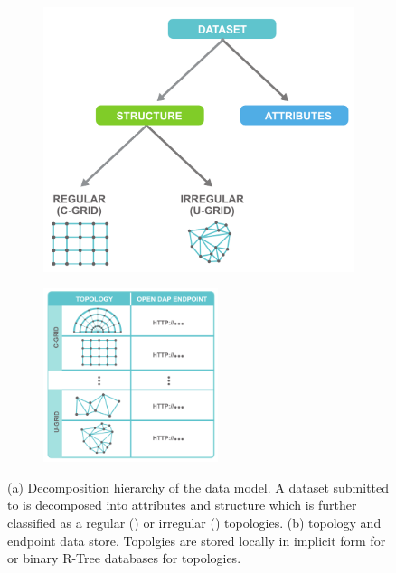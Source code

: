 \begin{figure}[ht!]
  \centering
  \begin{subfigure}[t]{0.45\textwidth}
    \includegraphics[width=\textwidth]{../figs/data_model_hierarchy}
  \caption{}
  \label{fig:data_hierarchy}
  \end{subfigure}
  \begin{subfigure}[t]{0.45\textwidth}
    \includegraphics[height=2in]{../figs/sciwms_book_db_topology_endpoint_chart}
    \caption{}
    \label{fig:sciwms_topology_endpoints}
  \end{subfigure}
  \caption{(a) Decomposition hierarchy of the data model. A dataset
    submitted to \sciwms{} is decomposed into attributes and structure
    which is further classified as a regular (\cgrid{}) or irregular
    (\ugrid{}) topologies. (b) \Sciwms{} topology and endpoint data
    store. Topolgies are stored locally in implicit form for \cgrid{}
    or binary R-Tree databases for \ugrid{} topologies. }
\end{figure}
